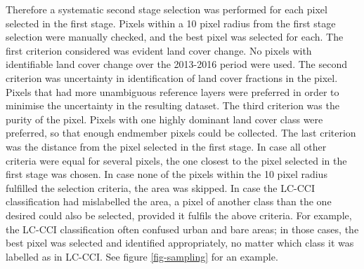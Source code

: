 \documentclass[a4paper,10pt]{book}
\begin{document}
Therefore a systematic second stage selection was performed for each pixel selected in the first stage. Pixels within a 10 pixel radius from the first stage selection were manually checked, and the best pixel was selected for each. The first criterion considered was evident land cover change. No pixels with identifiable land cover change over the 2013-2016 period were used. The second criterion was uncertainty in identification of land cover fractions in the pixel. Pixels that had more unambiguous reference layers were preferred in order to minimise the uncertainty in the resulting dataset. The third criterion was the purity of the pixel. Pixels with one highly dominant land cover class were preferred, so that enough endmember pixels could be collected. The last criterion was the distance from the pixel selected in the first stage. In case all other criteria were equal for several pixels, the one closest to the pixel selected in the first stage was chosen. In case none of the pixels within the 10 pixel radius fulfilled the selection criteria, the area was skipped. In case the LC-CCI classification had mislabelled the area, a pixel of another class than the one desired could also be selected, provided it fulfils the above criteria. For example, the LC-CCI classification often confused urban and bare areas; in those cases, the best pixel was selected and identified appropriately, no matter which class it was labelled as in LC-CCI. See figure \ref{fig-sampling} for an example.
\end{document}
